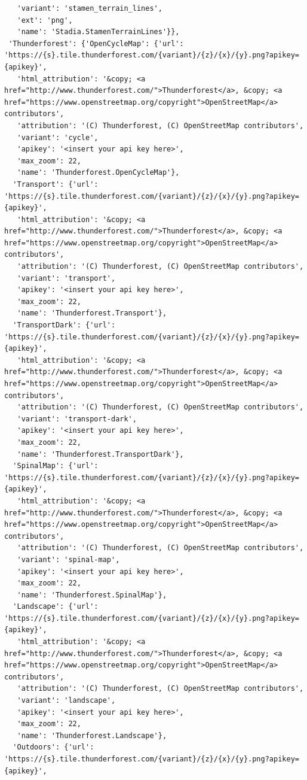 \documentclass[
  letterpaper,
  DIV=11,
  numbers=noendperiod]{scrreprt}
\begin{document}
\begin{verbatim}
   'variant': 'stamen_terrain_lines',
   'ext': 'png',
   'name': 'Stadia.StamenTerrainLines'}},
 'Thunderforest': {'OpenCycleMap': {'url': 'https://{s}.tile.thunderforest.com/{variant}/{z}/{x}/{y}.png?apikey={apikey}',
   'html_attribution': '&copy; <a href="http://www.thunderforest.com/">Thunderforest</a>, &copy; <a href="https://www.openstreetmap.org/copyright">OpenStreetMap</a> contributors',
   'attribution': '(C) Thunderforest, (C) OpenStreetMap contributors',
   'variant': 'cycle',
   'apikey': '<insert your api key here>',
   'max_zoom': 22,
   'name': 'Thunderforest.OpenCycleMap'},
  'Transport': {'url': 'https://{s}.tile.thunderforest.com/{variant}/{z}/{x}/{y}.png?apikey={apikey}',
   'html_attribution': '&copy; <a href="http://www.thunderforest.com/">Thunderforest</a>, &copy; <a href="https://www.openstreetmap.org/copyright">OpenStreetMap</a> contributors',
   'attribution': '(C) Thunderforest, (C) OpenStreetMap contributors',
   'variant': 'transport',
   'apikey': '<insert your api key here>',
   'max_zoom': 22,
   'name': 'Thunderforest.Transport'},
  'TransportDark': {'url': 'https://{s}.tile.thunderforest.com/{variant}/{z}/{x}/{y}.png?apikey={apikey}',
   'html_attribution': '&copy; <a href="http://www.thunderforest.com/">Thunderforest</a>, &copy; <a href="https://www.openstreetmap.org/copyright">OpenStreetMap</a> contributors',
   'attribution': '(C) Thunderforest, (C) OpenStreetMap contributors',
   'variant': 'transport-dark',
   'apikey': '<insert your api key here>',
   'max_zoom': 22,
   'name': 'Thunderforest.TransportDark'},
  'SpinalMap': {'url': 'https://{s}.tile.thunderforest.com/{variant}/{z}/{x}/{y}.png?apikey={apikey}',
   'html_attribution': '&copy; <a href="http://www.thunderforest.com/">Thunderforest</a>, &copy; <a href="https://www.openstreetmap.org/copyright">OpenStreetMap</a> contributors',
   'attribution': '(C) Thunderforest, (C) OpenStreetMap contributors',
   'variant': 'spinal-map',
   'apikey': '<insert your api key here>',
   'max_zoom': 22,
   'name': 'Thunderforest.SpinalMap'},
  'Landscape': {'url': 'https://{s}.tile.thunderforest.com/{variant}/{z}/{x}/{y}.png?apikey={apikey}',
   'html_attribution': '&copy; <a href="http://www.thunderforest.com/">Thunderforest</a>, &copy; <a href="https://www.openstreetmap.org/copyright">OpenStreetMap</a> contributors',
   'attribution': '(C) Thunderforest, (C) OpenStreetMap contributors',
   'variant': 'landscape',
   'apikey': '<insert your api key here>',
   'max_zoom': 22,
   'name': 'Thunderforest.Landscape'},
  'Outdoors': {'url': 'https://{s}.tile.thunderforest.com/{variant}/{z}/{x}/{y}.png?apikey={apikey}',

\end{verbatim}
\end{document}
